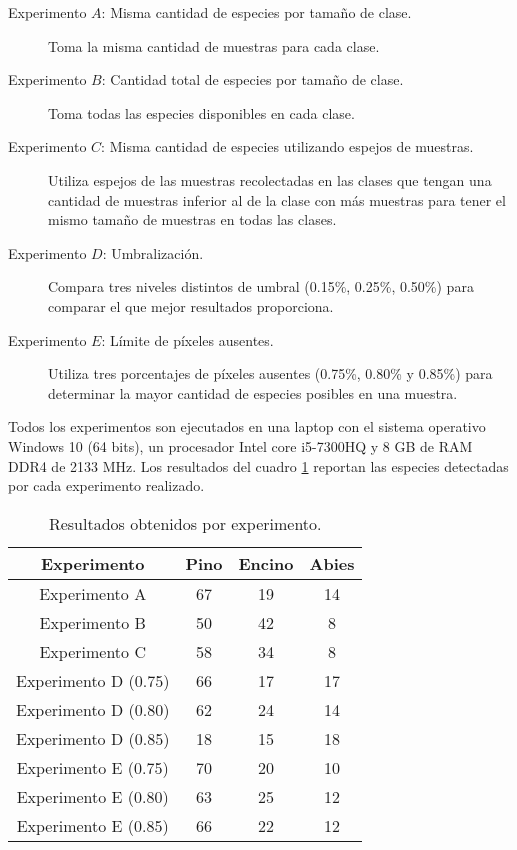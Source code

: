 \documentclass[review]{elsarticle}
\begin{document}
\begin{description}
\item[Experimento $A$: Misma cantidad de especies por tamaño de clase.]{Toma la misma cantidad de muestras para cada clase.}

\item[Experimento $B$:  Cantidad total de especies por tamaño de clase.]{Toma todas las especies disponibles en cada clase.}

\item[Experimento $C$: Misma cantidad de especies utilizando espejos de muestras.]{Utiliza espejos de las muestras recolectadas en las clases que tengan una cantidad de muestras inferior al de la clase con más muestras para tener el mismo tamaño de muestras en todas las clases.}

\item[Experimento $D$: Umbralización.]{Compara tres niveles distintos de umbral  (0.15\%, 0.25\%, 0.50\%) para comparar el que mejor resultados proporciona.} 

\item[Experimento $E$: Límite de píxeles ausentes.]{Utiliza tres porcentajes de píxeles ausentes (0.75\%, 0.80\% y 0.85\%) para determinar la mayor cantidad de especies posibles en una muestra.}
\end{description}
\clearpage

Todos los experimentos son ejecutados en una laptop con el sistema operativo Windows 10 (64 bits), un procesador Intel core i5-7300HQ y 8 GB de RAM DDR4 de 2133 MHz. Los resultados  del cuadro \ref{Resultados-obtenidos} reportan las especies detectadas por cada experimento realizado.

\begin{table}[h!]
\caption{Resultados obtenidos por experimento.}
\centering
\begin{tabular}{|c|c|c|c|}
			\hline
			 \textbf{Experimento} & \textbf{Pino} & \textbf{Encino} & \textbf{Abies}\\
			\hline
			Experimento A & 67 & 19 & 14\\
			\hline
			Experimento B & 50 & 42 & 8\\
			\hline
			Experimento C & 58 & 34 & 8\\
			\hline
			Experimento D (0.75) & 66 & 17 & 17\\
			\hline
			Experimento D (0.80) & 62 & 24 & 14\\
			\hline
			Experimento D (0.85) & 18 & 15 & 18\\
			\hline
			Experimento E (0.75) & 70 & 20 & 10\\
			\hline
			Experimento E (0.80) & 63 & 25 & 12\\
			\hline
			Experimento E (0.85) & 66 & 22 & 12\\
			\hline
		\end{tabular}
		\label{Resultados-obtenidos}
\end{table}
\end{document}
